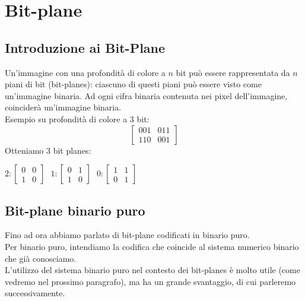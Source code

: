 \documentclass{report}
\begin{document}
	\chapter{Bit-plane}
	\section{Introduzione ai Bit-Plane}
	Un'immagine con una profondità di colore a $n$ bit può essere rappresentata da $n$ piani di bit (bit-planes): ciascuno di questi piani può essere visto come un'immagine binaria. Ad ogni cifra binaria contenuta nei pixel dell'immagine, coinciderà un'immagine binaria.\\
	Esempio su profondità di colore a 3 bit:
	$$
	\begin{bmatrix}
		001 & 011 \\
		110 & 001 
	\end{bmatrix}
	$$
	Otteniamo 3 bit planes:
	\begin{center}
		    
		$ 2:
		\begin{bmatrix}
			0 & 0 \\
			1 & 0 
		\end{bmatrix}
		$$ \ \ \ 1:
		\begin{bmatrix}
			0 & 1 \\
			1 & 0 
		\end{bmatrix}
		$$ \ \ \ 0:
		\begin{bmatrix}
			1 & 1 \\
			0 & 1 
		\end{bmatrix}
		$
	\end{center}
	\section{Bit-plane binario puro}
	Fino ad ora abbiamo parlato di bit-plane codificati in binario puro.\\
	Per binario puro, intendiamo la codifica che coincide al sistema numerico binario che già conosciamo. \\
	L'utilizzo del sistema binario puro nel contesto dei bit-planes è molto utile (come vedremo nel prossimo paragrafo), ma ha un grande svantaggio, di cui parleremo successivamente.
	
\end{document}

